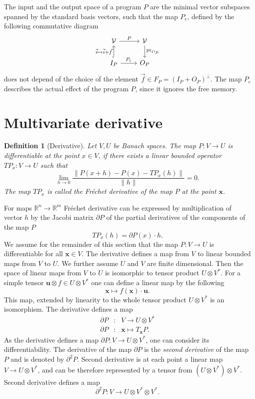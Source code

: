 \documentclass{article}
\newcommand{\RR}{\mathbb{R}}
\newcommand{\VV}{\mathcal{V}}
\newcommand{\x}{\mathbf{x}}
\newcommand{\uu}{\mathbf{u}}
\newcommand{\D}{\partial}
\newtheorem{definicija}{Definition}[section]
\begin{document}
The input and the output space of a program $P$ are the minimal
vector subspaces spanned by the standard basis vectors, such that the map $P_e$, 
defined by the following commutative diagram 
\begin{equation} 
    \label{eq:induced_map}
\begin{tikzcd}
  \VV \arrow{r}{P} & 
  \VV \arrow{d}{\mathrm{pr}_{O_P}}\\
  I_P \arrow[hook]{u}{\vec{i}\mapsto \vec{i}+\vec{f}} 
  \arrow{r}{P_e}& O_P
\end{tikzcd}
  \end{equation}
does not depend of the choice of the element 
$\vec{f}\in F_P=(I_P+O_P)^\perp$. The map $P_e$ describes the actual effect of the
program $P$, since it ignores the free memory. 
\section{Multivariate derivative}
\begin{definicija}[Derivative]
  Let $V,U$ be Banach spaces. The map $P:V\to U$ is differentiable at the point
  $x\in V$, if there exists a linear bounded operator $TP_x:V\to U$ such that
  \begin{equation}
    \label{eq:frechet}
    \lim_{h\to 0}\frac{\|P(x+h)-P(x)-TP_x(h)\|}{\|h\|} = 0.
  \end{equation}
  The map $TP_x$ is called the \emph{Fréchet derivative} of the map $P$ at the
  point $\x$.
\end{definicija}
For maps $\RR^n\to \RR^m$ Fréchet derivative can be expressed by multiplication
of vector $h$ by the Jacobi matrix $\D P$ of the  partial derivatives of the 
components of the map $P$
\begin{equation*}
  TP_x(h) = \D P(x)\cdot h.
\end{equation*}
We assume for the remainder of this section that the map $P:V\to U$ is
differentiable for all $\x\in V$. The derivative defines a map from $V$ to
linear bounded maps from $V$ to $U$. We further assume $U$ and $V$ are finite
dimensional. Then the space of linear maps from $V$ to $U$ is isomorphic to
tensor product $U\otimes V^*$. For a simple tensor $\uu\otimes f\in U\otimes
V^*$ one can define a linear map by the following
 \begin{equation}
   \label{eq:lin_tenzor}
   \x \mapsto f(\x)\cdot \uu.
 \end{equation}
This map, extended by linearity to the whole tensor product $U\otimes V^*$ is an
isomorphism. The derivative defines a map
\begin{eqnarray}
  \label{eq:odvod_preslikava}
  \D P&:& V\to U\otimes V^*\\
  \D P&:& \x \mapsto T_\x P.
\end{eqnarray}
As the derivative defines a map $\D P:V\to U\otimes V^*$, one can consider its
differentiability. The derivative of the map $\D P$ is the \emph{second derivative}
of the map $P$ and is denoted by $\D^2P$. Second derivative is at each point a
linear map  $V\to U\otimes V^*$, and can be therefore 
represented by a tensor from $(U\otimes V^*)\otimes V^*$. Second derivative
defines a map 
$$\D^2 P:V\to U\otimes V^*\otimes V^*.$$ 
\end{document}

